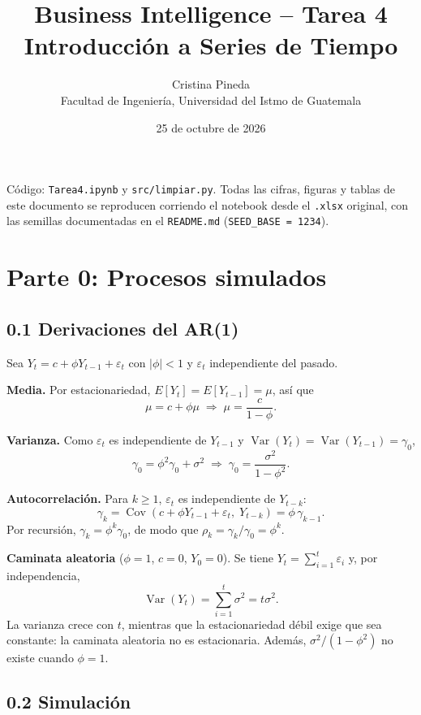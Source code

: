 \documentclass[11pt,letterpaper]{article}
\title{Business Intelligence -- Tarea 4\\Introducción a Series de Tiempo}
\author{Cristina Pineda\\Facultad de Ingeniería, Universidad del Istmo de Guatemala}
\date{25 de octubre de 2026}
\begin{document}
\maketitle

\noindent Código: \texttt{Tarea4.ipynb} y \texttt{src/limpiar.py}. Todas las cifras, figuras y tablas de este documento se reproducen corriendo el notebook desde el \texttt{.xlsx} original, con las semillas documentadas en el \texttt{README.md} (\texttt{SEED\_BASE = 1234}).

\section*{Parte 0: Procesos simulados}

\subsection*{0.1 Derivaciones del AR(1)}

Sea $Y_t = c + \phi Y_{t-1} + \varepsilon_t$ con $|\phi|<1$ y $\varepsilon_t$ independiente del pasado.

\textbf{Media.} Por estacionariedad, $E[Y_t]=E[Y_{t-1}]=\mu$, así que
\[
\mu = c + \phi\mu \;\Rightarrow\; \mu = \frac{c}{1-\phi}.
\]

\textbf{Varianza.} Como $\varepsilon_t$ es independiente de $Y_{t-1}$ y $\operatorname{Var}(Y_t)=\operatorname{Var}(Y_{t-1})=\gamma_0$,
\[
\gamma_0 = \phi^2\gamma_0 + \sigma^2 \;\Rightarrow\; \gamma_0 = \frac{\sigma^2}{1-\phi^2}.
\]

\textbf{Autocorrelación.} Para $k\ge 1$, $\varepsilon_t$ es independiente de $Y_{t-k}$:
\[
\gamma_k = \operatorname{Cov}(c+\phi Y_{t-1}+\varepsilon_t,\;Y_{t-k}) = \phi\,\gamma_{k-1}.
\]
Por recursión, $\gamma_k=\phi^k\gamma_0$, de modo que $\rho_k=\gamma_k/\gamma_0=\phi^k$.

\textbf{Caminata aleatoria} ($\phi=1$, $c=0$, $Y_0=0$). Se tiene $Y_t=\sum_{i=1}^{t}\varepsilon_i$ y, por independencia,
\[
\operatorname{Var}(Y_t)=\sum_{i=1}^{t}\sigma^2 = t\sigma^2 .
\]
La varianza crece con $t$, mientras que la estacionariedad débil exige que sea constante: la caminata aleatoria no es estacionaria. Además, $\sigma^2/(1-\phi^2)$ no existe cuando $\phi=1$.

\subsection*{0.2 Simulación}
\end{document}
